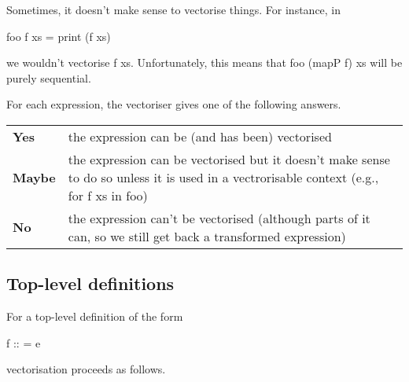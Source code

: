 \documentclass{article}
\begin{document}
Sometimes, it doesn't make sense to vectorise things. For instance, in

\begin{haskell}
foo f xs = print (f xs)
\end{haskell}

we wouldn't vectorise \<f xs\>. Unfortunately, this means that
\<foo (mapP f) xs\> will be purely sequential.

For each expression, the vectoriser gives one of the following answers.

\begin{tabular}{lp{10cm}}
\textbf{Yes} &
the expression can be (and has been) vectorised \\
\textbf{Maybe} &
the expression can be vectorised but it doesn't make sense to do so
unless it is used in a vectrorisable context (e.g., for \<f xs\> in \<foo\>)
\\
\textbf{No} &
the expression can't be vectorised (although parts of it can, so we
still get back a transformed expression)
\end{tabular}

\subsection*{Top-level definitions}

For a top-level definition of the form

\begin{haskell}
f :: \sigma = e
\end{haskell}

vectorisation proceeds as follows.
\end{document}
